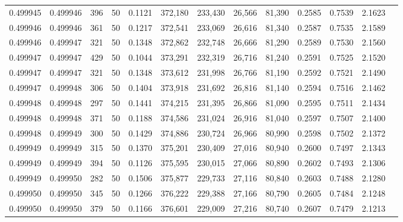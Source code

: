 \begin{tabular}{rrrrrrrrrrrrr}
0.499945 & 0.499946 &   396 &  50 &                                     0.1121 & 372,180 & 233,430 &  26,566 &  81,390 & 0.2585 & 0.7539 & 2.1623 \\
0.499946 & 0.499946 &   361 &  50 &                                     0.1217 & 372,541 & 233,069 &  26,616 &  81,340 & 0.2587 & 0.7535 & 2.1589 \\
0.499946 & 0.499947 &   321 &  50 &                                     0.1348 & 372,862 & 232,748 &  26,666 &  81,290 & 0.2589 & 0.7530 & 2.1560 \\
0.499947 & 0.499947 &   429 &  50 &                                     0.1044 & 373,291 & 232,319 &  26,716 &  81,240 & 0.2591 & 0.7525 & 2.1520 \\
0.499947 & 0.499947 &   321 &  50 &                                     0.1348 & 373,612 & 231,998 &  26,766 &  81,190 & 0.2592 & 0.7521 & 2.1490 \\
0.499947 & 0.499948 &   306 &  50 &                                     0.1404 & 373,918 & 231,692 &  26,816 &  81,140 & 0.2594 & 0.7516 & 2.1462 \\
0.499948 & 0.499948 &   297 &  50 &                                     0.1441 & 374,215 & 231,395 &  26,866 &  81,090 & 0.2595 & 0.7511 & 2.1434 \\
0.499948 & 0.499948 &   371 &  50 &                                     0.1188 & 374,586 & 231,024 &  26,916 &  81,040 & 0.2597 & 0.7507 & 2.1400 \\
0.499948 & 0.499949 &   300 &  50 &                                     0.1429 & 374,886 & 230,724 &  26,966 &  80,990 & 0.2598 & 0.7502 & 2.1372 \\
0.499949 & 0.499949 &   315 &  50 &                                     0.1370 & 375,201 & 230,409 &  27,016 &  80,940 & 0.2600 & 0.7497 & 2.1343 \\
0.499949 & 0.499949 &   394 &  50 &                                     0.1126 & 375,595 & 230,015 &  27,066 &  80,890 & 0.2602 & 0.7493 & 2.1306 \\
0.499949 & 0.499950 &   282 &  50 &                                     0.1506 & 375,877 & 229,733 &  27,116 &  80,840 & 0.2603 & 0.7488 & 2.1280 \\
0.499950 & 0.499950 &   345 &  50 &                                     0.1266 & 376,222 & 229,388 &  27,166 &  80,790 & 0.2605 & 0.7484 & 2.1248 \\
0.499950 & 0.499950 &   379 &  50 &                                     0.1166 & 376,601 & 229,009 &  27,216 &  80,740 & 0.2607 & 0.7479 & 2.1213 \\

\end{tabular}

